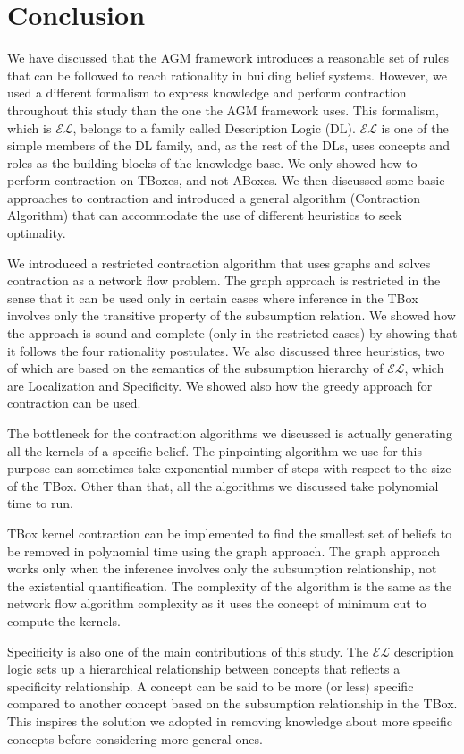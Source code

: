 \chapter{Conclusion}
We have discussed that the AGM framework introduces a reasonable set of rules that can be followed to reach rationality in building belief systems. However, we used a different formalism to express knowledge and perform contraction throughout this study than the one the AGM framework uses. This formalism, which is $\mathcal{EL}$, belongs to a family called Description Logic (DL). $\mathcal{EL}$ is one of the simple members of the DL family, and, as the rest of the DLs, uses concepts and roles as the building blocks of the knowledge base. We only showed how to perform contraction on TBoxes, and not ABoxes. We then discussed some basic approaches to contraction and introduced a general algorithm (Contraction Algorithm) that can accommodate the use of different heuristics to seek optimality. 

We introduced a restricted contraction algorithm that uses graphs and solves contraction as a network flow problem. The graph approach is restricted in the sense that it can be used only in certain cases where inference in the TBox involves only the transitive property of the subsumption relation. We showed how the approach is sound and complete (only in the restricted cases) by showing that it follows the four rationality postulates. We also discussed three heuristics, two of which are based on the semantics of the subsumption hierarchy of $\mathcal{EL}$, which are Localization and Specificity. We showed also how the greedy approach for contraction can be used.

The bottleneck for the contraction algorithms we discussed is actually generating all the kernels of a specific belief. The pinpointing algorithm we use for this purpose can sometimes take exponential number of steps with respect to the size of the TBox. Other than that, all the algorithms we discussed take polynomial time to run. 

TBox kernel contraction can be implemented to find the smallest set of beliefs to be removed in polynomial time using the graph approach. The graph approach works only when the inference involves only the subsumption relationship, not the existential quantification. The complexity of the algorithm is the same as the network flow algorithm complexity as it uses the concept of minimum cut to compute the kernels.

Specificity is also one of the main contributions of this study. The $\mathcal{EL}$ description logic sets up a hierarchical relationship between concepts that reflects a specificity relationship. A concept can be said to be more (or less) specific compared to another concept based on the subsumption relationship in the TBox. This inspires the solution we adopted in removing knowledge about more specific concepts before considering more general ones.

